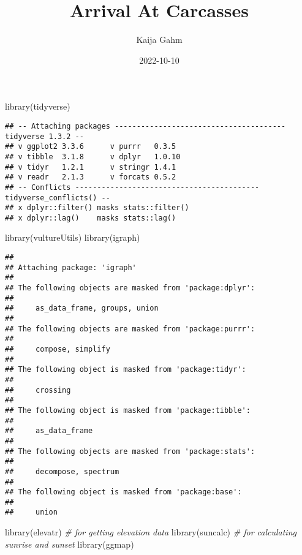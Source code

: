 \documentclass[
]{article}
\title{Arrival At Carcasses}
\author{Kaija Gahm}
\date{2022-10-10}
\newenvironment{Shaded}{\begin{snugshade}}{\end{snugshade}}
\newcommand{\CommentTok}[1]{\textcolor[rgb]{0.56,0.35,0.01}{\textit{#1}}}
\newcommand{\FunctionTok}[1]{\textcolor[rgb]{0.00,0.00,0.00}{#1}}
\newcommand{\NormalTok}[1]{#1}
\begin{document}
\maketitle

\begin{Shaded}
\begin{Highlighting}[]
\FunctionTok{library}\NormalTok{(tidyverse)}
\end{Highlighting}
\end{Shaded}

\begin{verbatim}
## -- Attaching packages --------------------------------------- tidyverse 1.3.2 --
## v ggplot2 3.3.6      v purrr   0.3.5 
## v tibble  3.1.8      v dplyr   1.0.10
## v tidyr   1.2.1      v stringr 1.4.1 
## v readr   2.1.3      v forcats 0.5.2 
## -- Conflicts ------------------------------------------ tidyverse_conflicts() --
## x dplyr::filter() masks stats::filter()
## x dplyr::lag()    masks stats::lag()
\end{verbatim}

\begin{Shaded}
\begin{Highlighting}[]
\FunctionTok{library}\NormalTok{(vultureUtils)}
\FunctionTok{library}\NormalTok{(igraph)}
\end{Highlighting}
\end{Shaded}

\begin{verbatim}
## 
## Attaching package: 'igraph'
## 
## The following objects are masked from 'package:dplyr':
## 
##     as_data_frame, groups, union
## 
## The following objects are masked from 'package:purrr':
## 
##     compose, simplify
## 
## The following object is masked from 'package:tidyr':
## 
##     crossing
## 
## The following object is masked from 'package:tibble':
## 
##     as_data_frame
## 
## The following objects are masked from 'package:stats':
## 
##     decompose, spectrum
## 
## The following object is masked from 'package:base':
## 
##     union
\end{verbatim}

\begin{Shaded}
\begin{Highlighting}[]
\FunctionTok{library}\NormalTok{(elevatr) }\CommentTok{\# for getting elevation data}
\FunctionTok{library}\NormalTok{(suncalc) }\CommentTok{\# for calculating sunrise and sunset}
\FunctionTok{library}\NormalTok{(ggmap)}
\end{Highlighting}
\end{Shaded}
\end{document}
